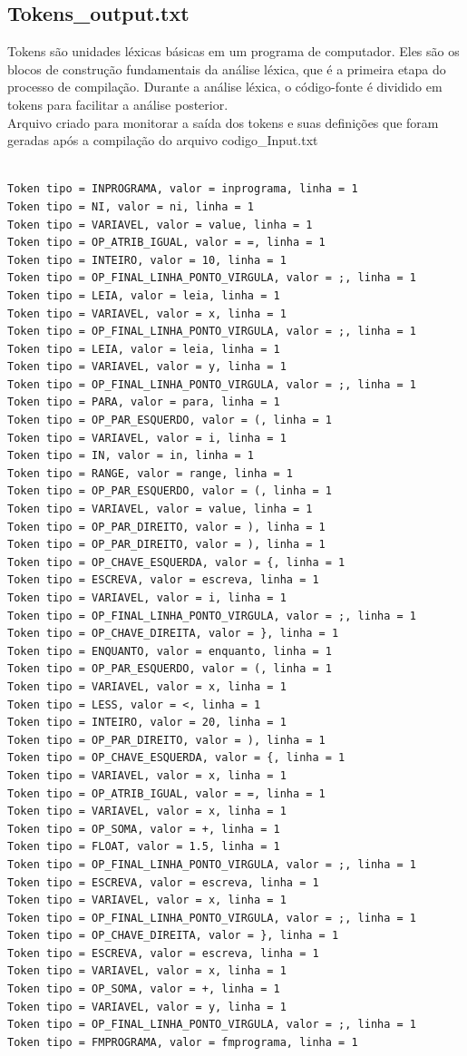 \documentclass[a4paper,12pt]{article}
\begin{document}
\subsection{Tokens\_output.txt}
Tokens são unidades léxicas básicas em um programa de computador. Eles 
são os blocos de construção fundamentais da análise léxica, que é a 
primeira etapa do processo de compilação. Durante a análise léxica, o 
código-fonte é dividido em tokens para facilitar a análise posterior.\\

Arquivo criado para monitorar a saída dos tokens e suas definições que 
foram geradas após a compilação do arquivo codigo\_Input.txt

\begin{verbatim}
    
Token tipo = INPROGRAMA, valor = inprograma, linha = 1
Token tipo = NI, valor = ni, linha = 1
Token tipo = VARIAVEL, valor = value, linha = 1
Token tipo = OP_ATRIB_IGUAL, valor = =, linha = 1
Token tipo = INTEIRO, valor = 10, linha = 1
Token tipo = OP_FINAL_LINHA_PONTO_VIRGULA, valor = ;, linha = 1
Token tipo = LEIA, valor = leia, linha = 1
Token tipo = VARIAVEL, valor = x, linha = 1
Token tipo = OP_FINAL_LINHA_PONTO_VIRGULA, valor = ;, linha = 1
Token tipo = LEIA, valor = leia, linha = 1
Token tipo = VARIAVEL, valor = y, linha = 1
Token tipo = OP_FINAL_LINHA_PONTO_VIRGULA, valor = ;, linha = 1
Token tipo = PARA, valor = para, linha = 1
Token tipo = OP_PAR_ESQUERDO, valor = (, linha = 1
Token tipo = VARIAVEL, valor = i, linha = 1
Token tipo = IN, valor = in, linha = 1
Token tipo = RANGE, valor = range, linha = 1
Token tipo = OP_PAR_ESQUERDO, valor = (, linha = 1
Token tipo = VARIAVEL, valor = value, linha = 1
Token tipo = OP_PAR_DIREITO, valor = ), linha = 1
Token tipo = OP_PAR_DIREITO, valor = ), linha = 1
Token tipo = OP_CHAVE_ESQUERDA, valor = {, linha = 1
Token tipo = ESCREVA, valor = escreva, linha = 1
Token tipo = VARIAVEL, valor = i, linha = 1
Token tipo = OP_FINAL_LINHA_PONTO_VIRGULA, valor = ;, linha = 1
Token tipo = OP_CHAVE_DIREITA, valor = }, linha = 1
Token tipo = ENQUANTO, valor = enquanto, linha = 1
Token tipo = OP_PAR_ESQUERDO, valor = (, linha = 1
Token tipo = VARIAVEL, valor = x, linha = 1
Token tipo = LESS, valor = <, linha = 1
Token tipo = INTEIRO, valor = 20, linha = 1
Token tipo = OP_PAR_DIREITO, valor = ), linha = 1
Token tipo = OP_CHAVE_ESQUERDA, valor = {, linha = 1
Token tipo = VARIAVEL, valor = x, linha = 1
Token tipo = OP_ATRIB_IGUAL, valor = =, linha = 1
Token tipo = VARIAVEL, valor = x, linha = 1
Token tipo = OP_SOMA, valor = +, linha = 1
Token tipo = FLOAT, valor = 1.5, linha = 1
Token tipo = OP_FINAL_LINHA_PONTO_VIRGULA, valor = ;, linha = 1
Token tipo = ESCREVA, valor = escreva, linha = 1
Token tipo = VARIAVEL, valor = x, linha = 1
Token tipo = OP_FINAL_LINHA_PONTO_VIRGULA, valor = ;, linha = 1
Token tipo = OP_CHAVE_DIREITA, valor = }, linha = 1
Token tipo = ESCREVA, valor = escreva, linha = 1
Token tipo = VARIAVEL, valor = x, linha = 1
Token tipo = OP_SOMA, valor = +, linha = 1
Token tipo = VARIAVEL, valor = y, linha = 1
Token tipo = OP_FINAL_LINHA_PONTO_VIRGULA, valor = ;, linha = 1
Token tipo = FMPROGRAMA, valor = fmprograma, linha = 1
\end{verbatim}
\end{document}
